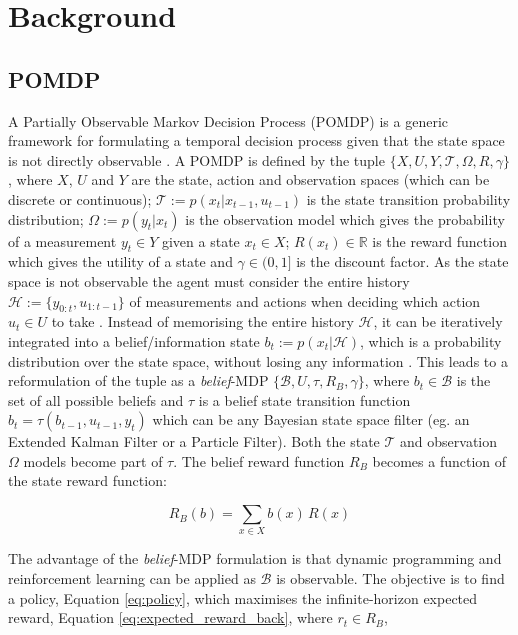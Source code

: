 \documentclass[final,5p,times,twocolumn]{elsarticle}
\begin{document}
\section{Background}\label{sec:related_work}

\subsection{POMDP}

A Partially Observable Markov Decision Process (POMDP) is a generic framework for formulating a temporal decision process 
given that the state space is not directly observable \cite{Sondik_1973}. A POMDP is defined by the tuple $\{X,U,Y,\mathcal{T},\Omega,R,\gamma\}$, 
where $X$, $U$ and $Y$ are the state, action and observation spaces (which can be discrete or continuous);
${\mathcal{T}:= p(x_t|x_{t-1},u_{t-1})}$ is the state transition probability distribution; $\Omega := p(y_t|x_t)$ is 
the observation model which gives the probability of a measurement $y_t \in Y$ given a state $x_t \in X$; 
$R(x_t) \in \mathbb{R}$ is the reward function which gives the utility of a state and $\gamma \in (0,1]$ is the discount factor. As the state space is not 
observable the agent must consider the entire history $\mathcal{H}:= \{y_{0:t},u_{1:t-1}\}$ of measurements and actions
when deciding which action $u_t \in U$ to take \cite{Ross08onlineplanning}. Instead of memorising the entire history $\mathcal{H}$, 
it can be iteratively integrated into a belief/information state ${b_t := p(x_t|\mathcal{H})}$, which 
is a probability distribution over the state space, without losing any information \cite{Milos_POMDP_2000}.
This leads to a reformulation of the tuple as a \textit{belief}-MDP $\{\mathcal{B},U,\tau,R_B,\gamma\}$, where $b_t \in \mathcal{B}$ is 
the set of all possible beliefs and $\tau$ is a belief state transition function $b_t = \tau(b_{t-1},u_{t-1},y_t)$ 
which can be any Bayesian state space filter (eg. an Extended Kalman Filter or a Particle Filter). Both the state $\mathcal{T}$ and observation 
$\Omega$ models become part of $\tau$. The belief reward function $R_B$ becomes a function of the state reward function:

\begin{equation}\label{eq:bel_reward_back}
  R_B(b) = \sum\limits_{x \in X} b(x)\, R(x)
\end{equation}

The advantage of the \textit{belief}-MDP formulation is that dynamic programming and reinforcement
learning can be applied as $\mathcal{B}$ is observable. The objective is to find a 
policy, Equation \ref{eq:policy}, which maximises the infinite-horizon expected reward, Equation 
\ref{eq:expected_reward_back}, where $r_t \in R_B$, 
\end{document}
